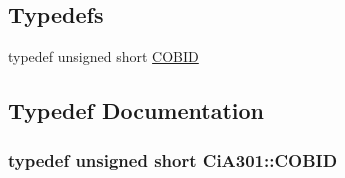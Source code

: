 \subsection*{Typedefs}
\begin{DoxyCompactItemize}
\item 
typedef unsigned short \hyperlink{namespace_ci_a301_aec5b5dbb2b60d2837c60499f6f297aa7}{C\-O\-B\-I\-D}
\end{DoxyCompactItemize}


\subsection{Typedef Documentation}
\hypertarget{namespace_ci_a301_aec5b5dbb2b60d2837c60499f6f297aa7}{
\subsubsection[{C\-O\-B\-I\-D}]{\setlength{\rightskip}{0pt plus 5cm}typedef unsigned short {\bf Ci\-A301\-::\-C\-O\-B\-I\-D}}}\label{namespace_ci_a301_aec5b5dbb2b60d2837c60499f6f297aa7}
